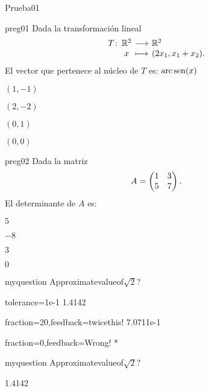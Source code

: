 \documentclass[10pt]{article}
\begin{document}
\begin{quiz}{Prueba01}

\begin{multi}{preg01}
    Dada la transformación lineal
    \[
        \funcion{T}{\R^2}{\R^2}{x}{(2x_1,x_1+x_2).}
    \]
    El vector que pertenece al núcleo de $T$ es: $\operatorname{arc\,sen}(x)$
    \item $(1,-1)$
    \item $(2,-2)$
    \item $(0,1)$
    \item* $(0,0)$
\end{multi}

\begin{multi}{preg02}
    Dada la matriz 
    \[
        A=
        \begin{pmatrix}
        1&3\cr
        5&7
        \end{pmatrix}.
    \]
    El determinante de $A$ es:
    \item $5$
    \item* $-8$
    \item $3$
    \item $0$
\end{multi}


\begin{numerical}[tolerance=0.01]{myquestion} 
    Approximatevalueof$\sqrt{2}$? 
    \item[tolerance={1e-1}]1.4142 
    \item[fraction=20,feedback={twicethis!}]7.0711e-1 \item[fraction=0,feedback={Wrong!}] * 
\end{numerical}



\begin{numerical}[tolerance=0.01]{myquestion} 
    Approximatevalueof$\sqrt{2}$? 
    \item 1.4142 
\end{numerical}


\end{quiz}
\end{document}
